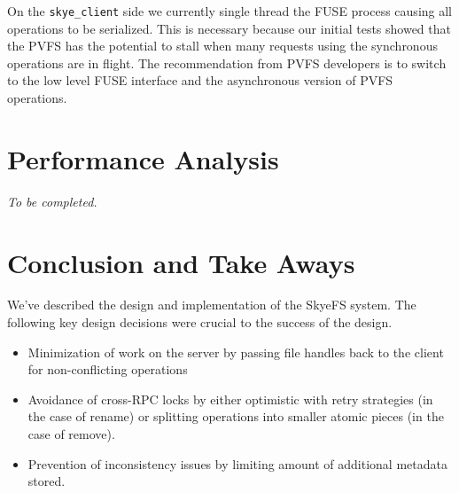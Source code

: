\documentclass[letterpaper]{article}
\newcommand{\code}[1]{\texttt{#1}}
\begin{document}
On the \code{skye\_\-client} side we currently single thread the FUSE process
causing all operations to be serialized.  This is necessary because our
initial tests showed that the PVFS has the potential to stall when many
requests using the synchronous operations are in flight.  The recommendation
from PVFS developers is to switch to the low level FUSE interface and the
asynchronous version of PVFS operations.

\section{Performance Analysis}

\emph{To be completed.}

\section{Conclusion and Take Aways}
We've described the design and implementation of the SkyeFS system.  The
following key design decisions were crucial to the success of the design.

\begin{itemize}
\item Minimization of work on the server by passing file handles back to the client
for non-conflicting operations
\item Avoidance of cross-RPC locks by either optimistic with retry strategies (in
the case of rename) or splitting operations into smaller atomic pieces (in the
case of remove).
\item Prevention of inconsistency issues by limiting amount of additional metadata
stored.
\end{itemize}
\end{document}
